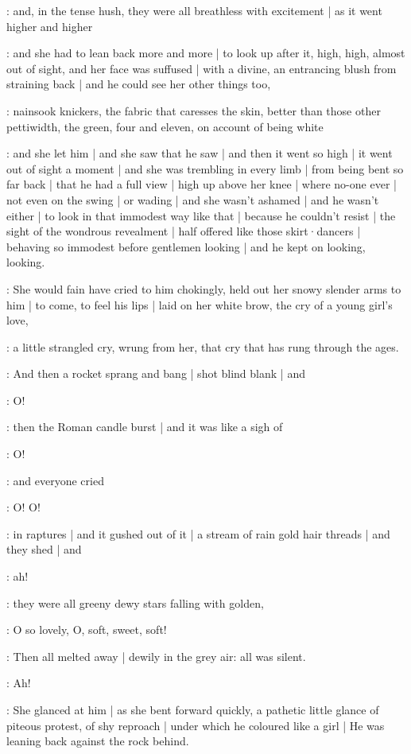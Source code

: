 :
and,
in the tense hush,
they were all breathless with excitement |
as it went higher and higher

\gertySex:
and she had to lean back more and more |
to look up after it,
high,
high,
almost out of sight,
and her face was suffused |
with a divine,
an entrancing blush from straining back |
and he could see her other things too,

\gertyReal:
nainsook knickers,
the fabric that caresses the skin,
better than those other pettiwidth,
the green,
four and eleven,
on account of being white

\gertySex:
and she let him |
and she saw that he saw |
and then it went so high |
it went out of sight a moment |
and she was trembling in every limb |
from being bent so far back |
that he had a full view |
high up above her knee |
where no-one ever |
not even on the swing |
or wading |
and she wasn't ashamed |
and he wasn't either |%
to look in that immodest way like that |
because he couldn't resist |
the sight of the wondrous revealment |
half offered like those skirt·dancers |
behaving so immodest before gentlemen looking |
and he kept on looking,
looking.

\gertyNovel:
She would fain have cried to him
chokingly,
held out her snowy slender arms to him |
to come,
to feel his lips |
laid on her white brow,
the cry of a young girl's love,

\gertySex:
a little strangled cry,
wrung from her,
that cry
that has rung through the ages.

:
And then a rocket
sprang and bang |
shot blind blank |
and

\gertySex:
O!

:
then the Roman candle burst |
and it was like a sigh of

\gertySex:
O!

:
and everyone cried

\All:
O!
O!

:
in raptures |
and it gushed out of it |
a stream of rain gold hair threads |
and they shed |
and

\All:
ah!

:
they were
all greeny dewy stars falling with golden,%

\gertySex:
O so lovely,
O,
soft,
sweet,
soft!

\Nnovel:
Then all melted away |
dewily in the grey air:
all was silent.

\gertySex:
Ah!

\Nnovel:
She glanced at him |
as she bent forward quickly,
a pathetic little glance of piteous protest,
of shy reproach |
under which he coloured like a girl |
He was leaning back against the rock behind.


